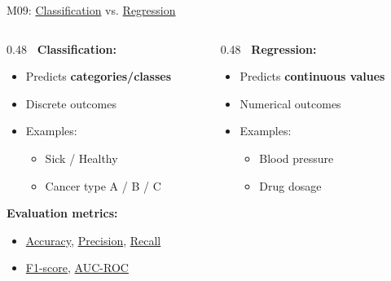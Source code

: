 \documentclass[aspectratio=169, 10pt]{beamer}
\begin{document}
\begin{frame}{M09: \href{https://en.wikipedia.org/wiki/Statistical_classification}{Classification} vs. \href{https://en.wikipedia.org/wiki/Regression_analysis}{Regression}}

    \begin{columns}
        \begin{column}{0.48\textwidth}
            \textbf{\faThLarge\ Classification:}
            \begin{itemize}
                \item Predicts \textbf{categories/classes}
                \item Discrete outcomes
                \item Examples:
                \begin{itemize}
                    \item Sick / Healthy
                    \item Cancer type A / B / C
                \end{itemize}
            \end{itemize}

            \vspace{2mm}
            \textbf{Evaluation metrics:}
            \footnotesize
            \begin{itemize}
                \item \href{https://en.wikipedia.org/wiki/Accuracy_and_precision\#In_classification}{Accuracy}, \href{https://en.wikipedia.org/wiki/Precision_and_recall\#Precision}{Precision}, \href{https://en.wikipedia.org/wiki/Precision_and_recall\#Recall}{Recall}
                \item \href{https://en.wikipedia.org/wiki/F-score}{F1-score}, \href{https://en.wikipedia.org/wiki/Receiver_operating_characteristic}{AUC-ROC}
            \end{itemize}
        \end{column}

        \begin{column}{0.48\textwidth}
            \textbf{\faChartLine\ Regression:}
            \begin{itemize}
                \item Predicts \textbf{continuous values}
                \item Numerical outcomes
                \item Examples:
                \begin{itemize}
                    \item Blood pressure
                    \item Drug dosage
                \end{itemize}
            \end{itemize}


\end{column}
\end{columns}
\end{frame}
\end{document}
